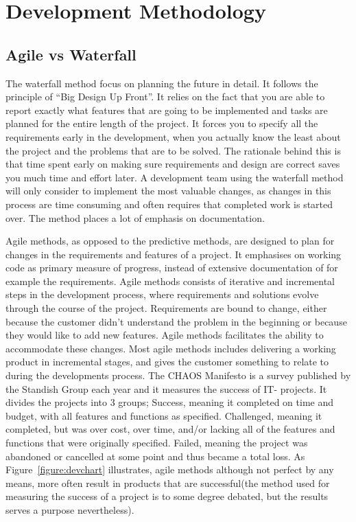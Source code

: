 \section{Development Methodology}
\subsection{Agile vs Waterfall}
The waterfall method focus on planning the future in detail. It follows the principle of “Big Design Up Front”. It relies on the fact that you are able to report exactly what features that are going to be implemented and tasks are planned for the entire length of the project. It forces you to specify all the requirements early in the development, when you actually know the least about the project and the problems that are to be solved. The rationale behind this is that time spent early on making sure requirements and design are correct saves you much time and effort later. A development team using the waterfall method will only consider to implement the most valuable changes, as changes in this process are time consuming and often requires that completed work is started over. The method places a lot of emphasis on documentation. 

Agile methods, as opposed to the predictive methods, are designed to plan for changes in the requirements and features of a project. It emphasises on working code as primary measure of progress, instead of extensive documentation of for example the requirements. Agile methods consists of iterative and incremental steps in the development process, where requirements and solutions evolve through the course of the project. Requirements are bound to change, either because the customer didn't understand the problem in the beginning or because they would like to add new features. Agile methods facilitates the ability to accommodate these changes. Most agile methods includes delivering a working product in incremental stages, and gives the customer something to relate to during the developments process. The CHAOS Manifesto is a survey published by the Standish Group each year and it measures the success of IT- projects. It divides the projects into 3 groups; Success, meaning it completed on time and budget, with all features and functions as specified. Challenged, meaning it  completed, but was over cost, over time, and/or lacking all of the features and functions that were originally specified. Failed, meaning the project was abandoned or cancelled at some point and thus became a total loss. As Figure~\ref{figure:devchart} illustrates, agile methods although not perfect by any means, more often result in products that are successful(the method used for measuring the success of a project is to some degree debated, but the results serves a purpose nevertheless).

